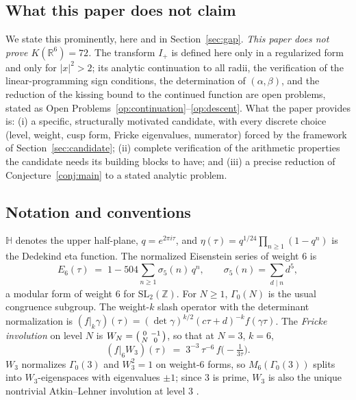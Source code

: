 \documentclass[11pt,reqno]{amsart}
\theoremstyle{plain}
\theoremstyle{definition}
\theoremstyle{remark}
\newcommand{\R}{\mathbb{R}}
\newcommand{\Z}{\mathbb{Z}}
\newcommand{\HH}{\mathbb{H}}
\newcommand{\Ip}{I_{+}}
\begin{document}
\subsection{What this paper does not claim}\label{subsec:noclaim}

We state this prominently, here and in Section~\ref{sec:gap}.
\emph{This paper does not prove $K(\R^6)=72$.}  The transform $\Ip$ is
defined here only in a regularized form and only for $|x|^2>2$; its
analytic continuation to all radii, the verification of the
linear-programming sign conditions, the determination of
$(\alpha,\beta)$, and the reduction of the kissing bound to the
continued function are open problems, stated as
Open Problems~\ref{op:continuation}--\ref{op:descent}.  What the paper
provides is: (i) a specific, structurally motivated candidate, with
every discrete choice (level, weight, cusp form, Fricke eigenvalues,
numerator) forced by the framework of Section~\ref{sec:candidate};
(ii) complete verification of the arithmetic properties the candidate
needs its building blocks to have; and (iii) a precise reduction of
Conjecture~\ref{conj:main} to a stated analytic problem.

\subsection{Notation and conventions}\label{subsec:notation}

$\HH$ denotes the upper half-plane, $q=e^{2\pi i\tau}$, and
$\eta(\tau)=q^{1/24}\prod_{n\ge1}(1-q^n)$ is the Dedekind eta
function.  The normalized Eisenstein series of weight $6$ is
\[
E_6(\tau)\;=\;1-504\sum_{n\ge1}\sigma_5(n)\,q^n ,
\qquad \sigma_5(n)=\sum_{d\mid n}d^5 ,
\]
a modular form of weight $6$ for $\mathrm{SL}_2(\Z)$.
For $N\ge1$, $\Gamma_0(N)$ is the usual congruence subgroup.  The
weight-$k$ slash operator with the determinant normalization is
$(f|_k\gamma)(\tau)=(\det\gamma)^{k/2}(c\tau+d)^{-k}f(\gamma\tau)$.
The \emph{Fricke involution} on level $N$ is
$W_N=\begin{psmallmatrix}0&-1\\N&0\end{psmallmatrix}$, so that at
$N=3$, $k=6$,
\begin{equation}\label{eq:slashW3}
(f|_6W_3)(\tau)\;=\;3^{-3}\,\tau^{-6}\,f\!\big(-\tfrac1{3\tau}\big).
\end{equation}
$W_3$ normalizes $\Gamma_0(3)$ and $W_3^2=1$ on weight-$6$ forms, so
$M_6(\Gamma_0(3))$ splits into $W_3$-eigenspaces with eigenvalues
$\pm1$; since $3$ is prime, $W_3$ is also the unique nontrivial
Atkin--Lehner involution at level $3$ \cite{AtkinLehner1970}.
\end{document}
